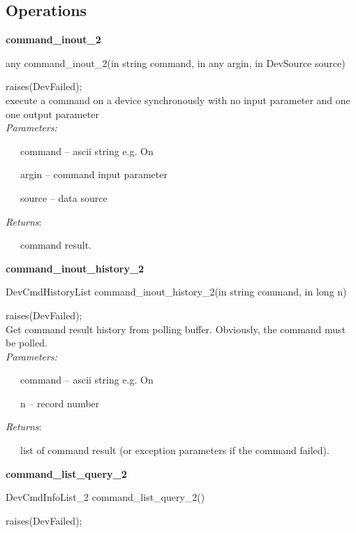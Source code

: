 \subsection{Operations}

\textbf{command\_inout\_2}

any command\_inout\_2(in string command, in any argin, in DevSource
source)

raises(DevFailed);\\


execute a command on a device synchronously with no input parameter
and one one output parameter\\


\emph{Parameters:}

~~~command -- ascii string e.g. \textquotedbl{}On\textquotedbl{}

~~~argin -- command input parameter

~~~source -- data source

\emph{Returns}:

~~~command result.\\


\begin{flushleft}
\textbf{command\_inout\_history\_2}
\par\end{flushleft}

DevCmdHistoryList command\_inout\_history\_2(in string command, in
long n)

raises(DevFailed);\\


Get command result history from polling buffer. Obviously, the command
must be polled.\\


\emph{Parameters:}

~~~command -- ascii string e.g. \textquotedbl{}On\textquotedbl{}

~~~n -- record number

\emph{Returns}:

~~~list of command result (or exception parameters if the command
failed).\\


\begin{flushleft}
\textbf{command\_list\_query\_2}
\par\end{flushleft}

DevCmdInfoList\_2 command\_list\_query\_2()

raises(DevFailed);\\


